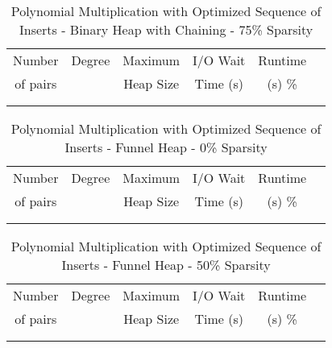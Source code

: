 \documentclass[11pt, one-sided]{amsart}
\begin{document}
\begin{table}[htbp]
   \centering
      \caption{Polynomial Multiplication with Optimized Sequence of Inserts - Binary Heap with Chaining - 75\% Sparsity}
   \begin{tabular}{|c|c|c|c|c|c|}
   	\hline
		 Number   & 	Degree	& Maximum & I/O Wait		& Runtime 	 \\ 
		 of pairs 	&			& Heap Size	& Time (s)		&	(s)		 		\%				\\ \hline
		 		&			&			&			&						\\
		 		&			&			&			&						\\
   \end{tabular}
   \label{tab:booktabs}
\end{table}







\newpage


\begin{table}[htbp]
   \centering
      \caption{Polynomial Multiplication with Optimized Sequence of Inserts - Funnel Heap - 0\% Sparsity}
   \begin{tabular}{|c|c|c|c|c|c|}
   	\hline
		 Number   & 	Degree	& Maximum & I/O Wait		&  Runtime  \\ 
		 of pairs 	&			& Heap Size	& Time (s)		&	(s)	 		\%				\\ \hline
		 		&			&			&			&					\\
		 		&			&			&			&					\\
   \end{tabular}
   \label{tab:booktabs}
\end{table}

\begin{table}[htbp]
   \centering
      \caption{Polynomial Multiplication with Optimized Sequence of Inserts - Funnel Heap - 50\% Sparsity}
   \begin{tabular}{|c|c|c|c|c|c|}
   	\hline
		 Number   & 	Degree	& Maximum & 	I/O Wait	&  Runtime 	 \\ 
		 of pairs 	&			& Heap Size	& 	Time (s)		&	(s)	 		\%				\\ \hline
		 		&			&			&			&						\\
		 		&			&			&			&						\\
   \end{tabular}
   \label{tab:booktabs}
\end{table}
\end{document}
